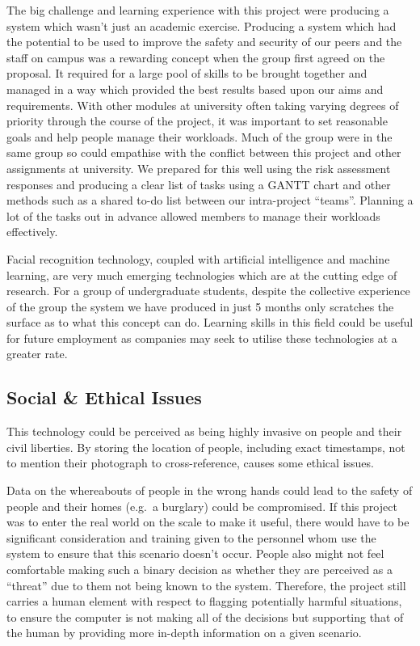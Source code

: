\documentclass[
  english,
  a4paper,
,tablecaptionabove
]{scrartcl}
\begin{document}
The big challenge and learning experience with this project were
producing a system which wasn't just an academic exercise. Producing a
system which had the potential to be used to improve the safety and
security of our peers and the staff on campus was a rewarding concept
when the group first agreed on the proposal. It required for a large
pool of skills to be brought together and managed in a way which
provided the best results based upon our aims and requirements. With
other modules at university often taking varying degrees of priority
through the course of the project, it was important to set reasonable
goals and help people manage their workloads. Much of the group were in
the same group so could empathise with the conflict between this project
and other assignments at university. We prepared for this well using the
risk assessment responses and producing a clear list of tasks using a
GANTT chart and other methods such as a shared to-do list between our
intra-project \enquote{teams}. Planning a lot of the tasks out in
advance allowed members to manage their workloads effectively.

Facial recognition technology, coupled with artificial intelligence and
machine learning, are very much emerging technologies which are at the
cutting edge of research. For a group of undergraduate students, despite
the collective experience of the group the system we have produced in
just 5 months only scratches the surface as to what this concept can do.
Learning skills in this field could be useful for future employment as
companies may seek to utilise these technologies at a greater rate.

\hypertarget{social-ethical-issues}{%
\subsection{Social \& Ethical Issues}\label{social-ethical-issues}}

This technology could be perceived as being highly invasive on people
and their civil liberties. By storing the location of people, including
exact timestamps, not to mention their photograph to cross-reference,
causes some ethical issues.

Data on the whereabouts of people in the wrong hands could lead to the
safety of people and their homes (e.g.~a burglary) could be compromised.
If this project was to enter the real world on the scale to make it
useful, there would have to be significant consideration and training
given to the personnel whom use the system to ensure that this scenario
doesn't occur. People also might not feel comfortable making such a
binary decision as whether they are perceived as a \enquote{threat} due
to them not being known to the system. Therefore, the project still
carries a human element with respect to flagging potentially harmful
situations, to ensure the computer is not making all of the decisions
but supporting that of the human by providing more in-depth information
on a given scenario.
\end{document}
